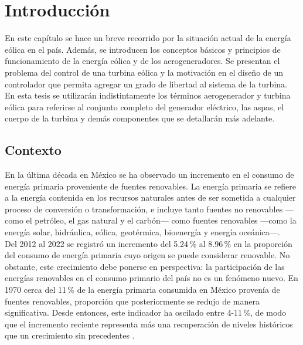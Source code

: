 \chapter{Introducción} \label{intro_chapter}

En este capítulo se hace un breve recorrido por la situación actual de la energía eólica en el país. 
Además, se introducen los conceptos básicos y principios de funcionamiento de la energía eólica y de 
los aerogeneradores. Se presentan el problema del control de una turbina eólica y la motivación en 
el diseño de un controlador que permita agregar un grado de libertad al sistema de la turbina. 
\\

En esta tesis se utilizarán indistintamente los términos aerogenerador y turbina eólica 
para referirse al conjunto completo del generador eléctrico, las aspas, el cuerpo de la turbina y 
demás componentes que se detallarán más adelante. 


\section{Contexto}

En la última década en México se ha observado un incremento en el 
consumo de energía primaria proveniente de fuentes renovables. La energía 
primaria se refiere a la energía contenida en los recursos naturales antes 
de ser sometida a cualquier proceso de conversión o transformación, e 
incluye tanto fuentes no renovables ---como el petróleo, el gas natural y 
el carbón--- como fuentes renovables ---como la energía solar, hidráulica, 
eólica, geotérmica, bioenergía y energía oceánica---.
\\

Del 2012 al 2022 se registró un incremento del 5.24\,\% al 8.96\,\% en la 
proporción del consumo de energía primaria cuyo origen se puede considerar 
renovable. No obstante, este crecimiento debe ponerse en perspectiva: la 
participación de las energías renovables en el consumo primario del país 
no es un fenómeno nuevo. En 1970 cerca del 11\,\% de la energía primaria 
consumida en México provenía de fuentes renovables, proporción que 
posteriormente se redujo de manera significativa. Desde entonces, este 
indicador ha oscilado entre 4-11\,\%, de modo que el incremento reciente 
representa más una recuperación de niveles históricos que un crecimiento 
sin precedentes \cite{EnergyInstitute2023}.
\\

